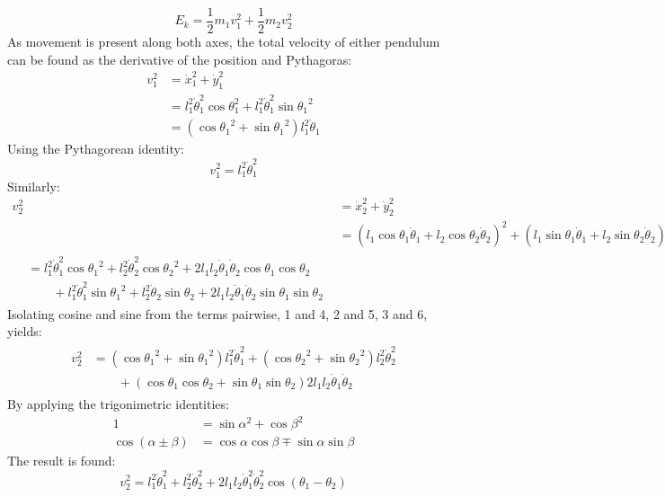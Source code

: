 \begin{equation}
	\label{eq:ek}
	E_k = \frac{1}{2}m_1v_1^2+\frac{1}{2}m_2v_2^2
\end{equation}
As movement is present along both axes, the total velocity of either pendulum can be found as the derivative of the position and Pythagoras:
\begin{align}
	v_1^2 &= \dot{x}_1^2+\dot{y}_1^2\\
		&= l_1^2\dot{\theta}_1^2\cos{\theta}_1^2+l_1^2\dot{\theta}_1^2\sin{\theta_1}^2\\
		&= (\cos{\theta_1}^2+\sin{\theta_1}^2)l_1^2\dot{\theta}_1
\end{align}
Using the Pythagorean identity:
\begin{equation}
	\label{eq:v1}
	v_1^2 = l_1^2\dot{\theta}_1^2
\end{equation}
Similarly:
\begin{align}
	v_2^2 &= \dot{x}_2^2+\dot{y}_2^2\\
	&= (l_1\cos{\theta}_1\dot{\theta}_1 + l_2\cos{\theta_2}\dot{\theta}_2)^2+(l_1\sin{\theta}_1\dot{\theta}_1 + l_2\sin{\theta_2}\dot{\theta}_2)^2\\
	\begin{split}
		&= l_1^2\dot\theta_1^2\cos{\theta_1}^2+l_2^2\dot\theta_2^2\cos{\theta_2}^2+2l_1l_2\dot\theta_1\dot\theta_2\cos{\theta_1}\cos{\theta_2}\\
		&\qquad +l_1^2\dot\theta_1^2\sin{\theta_1}^2+l_2^2\dot\theta_2\sin{\theta_2}+2l_1l_2\dot\theta_1\dot\theta_2\sin{\theta_1}\sin{\theta_2}
	\end{split}
\end{align}
Isolating cosine and sine from the terms pairwise, 1 and 4, 2 and 5, 3 and 6, yields:
\begin{align}
	\begin{split}
		v_2^2&=(\cos{\theta_1}^2+\sin{\theta_1}^2)l_1^2\dot\theta_1^2+(\cos{\theta_2}^2+\sin{\theta_2}^2)l_2^2\dot\theta_2^2\\
	&\qquad+(\cos{\theta_1}\cos{\theta_2}+\sin{\theta_1}\sin{\theta_2})2l_1l_2\dot\theta_1\dot\theta_2
	\end{split}
\end{align}
By applying the trigonimetric identities:
\begin{align}
	1&=\sin{\alpha^2}+\cos{\beta^2}\\
	\cos{(\alpha\pm\beta)}&=\cos\alpha\cos\beta\mp\sin\alpha\sin\beta
\end{align}
The result is found:
\begin{equation}
	\label{eq:v2}
	v_2^2=l_1^2\dot\theta_1^2+l_2^2\dot\theta_2^2+2l_1l_2\dot\theta_1^2\dot\theta_2^2\cos{(\theta_1-\theta_2)}
\end{equation}
